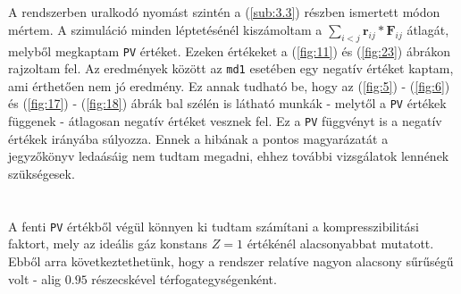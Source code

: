 \begin{multicols}{2}
\\ \\
A rendszerben uralkodó nyomást szintén a (\ref{sub:3.3}) részben ismertett módon mértem. A szimuláció minden léptetésénél kiszámoltam a $\sum_{i < j} \boldsymbol{r}_{ij} * \boldsymbol{F}_{ij}$ átlagát, melyből megkaptam \texttt{PV} értéket. Ezeken értékeket a (\ref{fig:11}) és (\ref{fig:23}) ábrákon rajzoltam fel. Az eredmények között az \texttt{md1} esetében egy negatív értéket kaptam, ami érthetően nem jó eredmény. Ez annak tudható be, hogy az (\ref{fig:5}) - (\ref{fig:6}) és (\ref{fig:17}) - (\ref{fig:18}) ábrák bal szélén is látható munkák - melytől a \texttt{PV} értékek függenek - átlagosan negatív értéket vesznek fel. Ez a \texttt{PV} függvényt is a negatív értékek irányába súlyozza. Ennek a hibának a pontos magyarázatát a jegyzőkönyv ledaásáig nem tudtam megadni, ehhez további vizsgálatok lennének szükségesek. \\
\\ \\
A fenti \texttt{PV} értékből végül könnyen ki tudtam számítani a kompresszibilitási faktort, mely az ideális gáz konstans $Z = 1$ értékénél alacsonyabbat mutatott. Ebből arra következtethetünk, hogy a rendszer relatíve nagyon alacsony sűrűségű volt - alig $0.95$ részecskével térfogategységenként.


\end{multicols}
